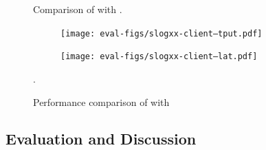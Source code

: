 \begin{figure}[ht]
	\centering
	\hfill %
\caption{Comparison of \slog with \slogxx.}
\label{fig:comparison}
\end{figure}




\begin{figure}[t]
	\centering
	\begin{subfigure}[t]{0.49\columnwidth}
	   \centering
  	   \texttt{[image: eval-figs/slogxx-client--tput.pdf]}
	\end{subfigure}
	\begin{subfigure}[t]{0.49\columnwidth}
		\centering
		\texttt{[image: eval-figs/slogxx-client--lat.pdf]}
	\end{subfigure}
 
\caption{Performance comparison of \slog with \slogxx}.
\end{figure}


\subsection{Evaluation and Discussion}

\clearpage